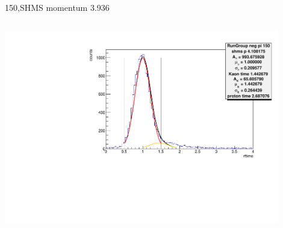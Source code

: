 \documentclass[aspectratio=169,xcolor=dvipsnames]{beamer}
\begin{document}
\begin{frame}{150,SHMS momentum 3.936}
\begin{columns}
\begin{column}[T]{0.3\textwidth}
\includegraphics[width = 0.9\textwidth]{results/pid/rftime/rftime_neg_150_5_pi.pdf}
\end{column}
\end{columns}
\end{frame}
\end{document}
